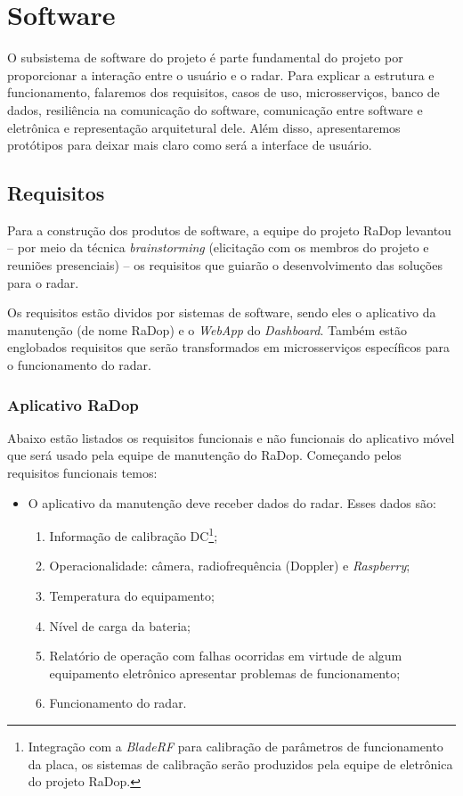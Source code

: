 \chapter{Software}

O subsistema de software do projeto é parte fundamental do projeto por proporcionar a interação entre o usuário e o radar. Para explicar a estrutura e funcionamento, falaremos dos requisitos, casos de uso, microsserviços, banco de dados, resiliência na comunicação do software, comunicação entre software e eletrônica e representação arquitetural dele. Além disso, apresentaremos protótipos para deixar mais claro como será a interface de usuário.

\section{Requisitos}

Para a construção dos produtos de software, a equipe do projeto RaDop levantou -- por meio da técnica \textit{brainstorming} (elicitação com os membros do projeto e reuniões presenciais) -- os requisitos que guiarão o desenvolvimento das soluções para o radar.

Os requisitos estão dividos por sistemas de software, sendo eles o aplicativo da manutenção (de nome RaDop) e o \textit{WebApp} do \textit{Dashboard}. Também estão englobados requisitos que serão transformados em microsserviços específicos para o funcionamento do radar.

\subsection{Aplicativo RaDop}

Abaixo estão listados os requisitos funcionais e não funcionais do aplicativo móvel que será usado pela equipe de manutenção do RaDop. Começando pelos requisitos funcionais temos:


\begin{itemize}
  \item O aplicativo da manutenção deve receber dados do radar. Esses dados são:
  \begin{enumerate}
    \item Informação de calibração DC\footnote{Integração com a \textit{BladeRF} para calibração de parâmetros de funcionamento da placa, os sistemas de calibração serão produzidos pela equipe de eletrônica do projeto RaDop.};
    \item Operacionalidade: câmera, radiofrequência (Doppler) e \textit{Raspberry};
    \item Temperatura do equipamento;
    \item Nível de carga da bateria;
    \item Relatório de operação com falhas ocorridas em virtude de algum equipamento eletrônico apresentar problemas de funcionamento;
    \item Funcionamento do radar.
  \end{enumerate}
\end{itemize}

